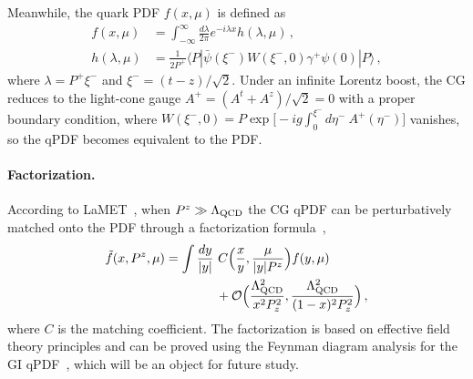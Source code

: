\documentclass[prd,twocolumn,preprintnumbers,showpacs,nofootinbib,superscriptaddress,notitlepage,floatfix]{revtex4-1}
\newcommand{\nn}{\nonumber}
\begin{document}
Meanwhile, the quark PDF $f(x,\mu)$ is defined as
\begin{align}
    f(x,\mu) &= \int_{-\infty}^\infty \frac{d\lambda}{2\pi} e^{-i\lambda x} h(\lambda,\mu)\,,\\
    h(\lambda,\mu) &= \frac{1}{2P^+} \langle P| \bar{\psi}(\xi^-)W(\xi^-,0) \gamma^+ \psi(0)|P\rangle\,,
\end{align}
where $\lambda=P^+\xi^-$ and $\xi^- = (t- z)/\sqrt{2}$.  Under an infinite Lorentz boost, the CG reduces to the light-cone gauge $A^+=(A^t+A^z)/\sqrt{2}=0$ with a proper boundary condition, where $W(\xi^-,0)=P\exp\big[-ig\int_0^{\xi^-}d\eta^-\ A^+(\eta^-)\big]$ vanishes, so the qPDF becomes equivalent to the PDF.

\paragraph*{Factorization.} According to LaMET~\cite{Ji:2020ect}, when $P^z\gg \Lambda_{\rm QCD}$ the CG qPDF can be perturbatively matched onto the PDF through a factorization formula~\cite{Izubuchi:2018srq},
\begin{align}\label{eq:fact}
	\tilde f(x,P^z,\mu) &= \int {dy\over |y|}\ C\Big({x\over y}, {\mu\over |y|P^z}\Big) f(y,\mu) \nn\\
	&\qquad\qquad + {\cal O}\Big({\Lambda_{\rm QCD}^2\over x^2P_z^2},{\Lambda_{\rm QCD}^2\over(1-x)^2P_z^2}\Big)\,,
\end{align}
where $C$ is the matching coefficient. The factorization is based on effective field theory principles and can be proved using the Feynman diagram analysis for the GI qPDF~\cite{Ma:2014jla,Ji:2020ect}, which will be an object for future study.
\end{document}
